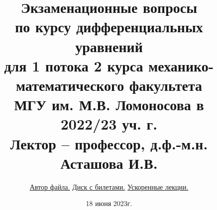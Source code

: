 \documentclass{article}
\begin{document}
\title{\LARGE{\textbf{Экзаменационные вопросы}}\\[2pt] \large{\textbf{по курсу дифференциальных уравнений}} \\[2pt] \large{\textbf{для 1 потока 2 курса механико-математического факультета}} \\[2pt] \large{\textbf{МГУ им. М.В. Ломоносова в 2022/23 уч. г.}} \\[2pt] \large{\textbf{Лектор – профессор, д.ф.-м.н. Асташова И.В.}}}
\author{\href{https://vk.com/dov4k1n}{Автор файла.} \href{https://drive.google.com/drive/u/0/folders/12TsXEuxM-RLdqzWjB2Olcbk1MkR-lWaz}{Диск с билетами.} \href{https://www.youtube.com/@mm_videoaccelerator}{Ускоренные лекции.}}
\date{18 июня 2023г.}

\maketitle
\end{document}
